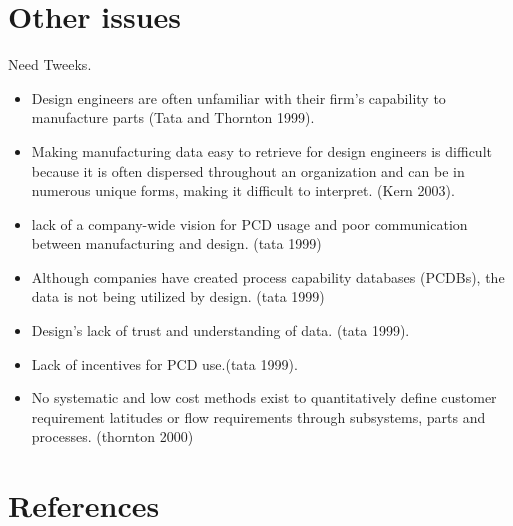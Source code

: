 \documentclass[aip,amsmath,reprint, author-year]{revtex4-1}
\begin{document}
\section{Other issues}

Need Tweeks. 

\begin{itemize}

\item{Design engineers are often unfamiliar with their firm’s capability to manufacture parts (Tata and Thornton 1999).}
\item{Making manufacturing data easy to retrieve for design engineers is difficult because it is often dispersed throughout an organization and can be in numerous unique forms, making it difficult to interpret. (Kern 2003).}
\item{lack of a company-wide vision for PCD usage and poor communication between manufacturing and design. (tata 1999)}
\item{Although companies have created process capability databases (PCDBs), the data is not being utilized by design. (tata 1999)}
\item{Design’s lack of trust and understanding of data. (tata 1999).}
\item{Lack of incentives for PCD use.(tata 1999).}
\item{No systematic and low cost methods exist to quantitatively define customer requirement latitudes or flow requirements through subsystems, parts and processes. (thornton 2000)}

\end{itemize} 



\section*{References}

\end{document}
